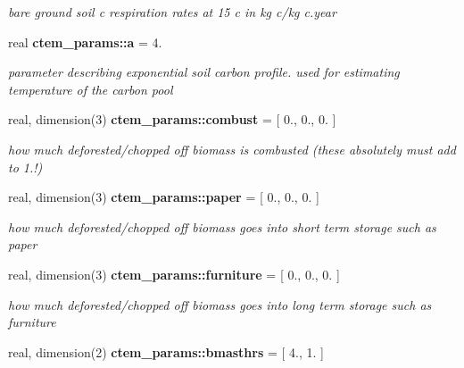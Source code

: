\begin{DoxyCompactItemize}
\begin{DoxyCompactList}\small\item\em bare ground soil c respiration rates at 15 c in kg c/kg c.\+year \end{DoxyCompactList}\item 
\hypertarget{namespacectem__params_a8822a85e4e8060308fbdb71f7983e926}{}real {\bfseries ctem\+\_\+params\+::a} = 4.\label{namespacectem__params_a8822a85e4e8060308fbdb71f7983e926}

\begin{DoxyCompactList}\small\item\em parameter describing exponential soil carbon profile. used for estimating temperature of the carbon pool \end{DoxyCompactList}\item 
\hypertarget{namespacectem__params_aa754be19830b01b24a5a992122c67f6f}{}real, dimension(3) {\bfseries ctem\+\_\+params\+::combust} = \mbox{[} 0., 0., 0. \mbox{]}\label{namespacectem__params_aa754be19830b01b24a5a992122c67f6f}

\begin{DoxyCompactList}\small\item\em how much deforested/chopped off biomass is combusted (these absolutely must add to 1.!) \end{DoxyCompactList}\item 
\hypertarget{namespacectem__params_a39b15413313f38228e1c02dbd0d672f3}{}real, dimension(3) {\bfseries ctem\+\_\+params\+::paper} = \mbox{[} 0., 0., 0. \mbox{]}\label{namespacectem__params_a39b15413313f38228e1c02dbd0d672f3}

\begin{DoxyCompactList}\small\item\em how much deforested/chopped off biomass goes into short term storage such as paper \end{DoxyCompactList}\item 
\hypertarget{namespacectem__params_afde8cda60ab64e6f3699c990584b5aaf}{}real, dimension(3) {\bfseries ctem\+\_\+params\+::furniture} = \mbox{[} 0., 0., 0. \mbox{]}\label{namespacectem__params_afde8cda60ab64e6f3699c990584b5aaf}

\begin{DoxyCompactList}\small\item\em how much deforested/chopped off biomass goes into long term storage such as furniture \end{DoxyCompactList}\item 
\hypertarget{namespacectem__params_a49b01c9f504b799a16e1aa9224c1011f}{}real, dimension(2) {\bfseries ctem\+\_\+params\+::bmasthrs} = \mbox{[} 4., 1. \mbox{]}\label{namespacectem__params_a49b01c9f504b799a16e1aa9224c1011f}


\end{DoxyCompactItemize}

